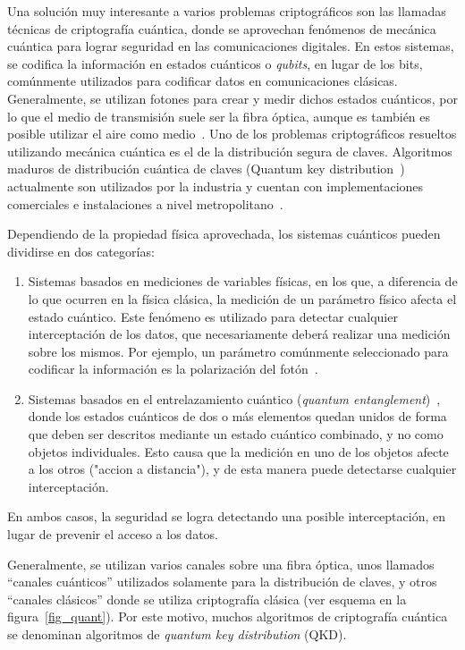 \label{quantcry}
Una solución muy interesante a varios problemas criptográficos son las llamadas técnicas de criptografía cuántica, donde se aprovechan fenómenos de mecánica cuántica para lograr seguridad en las comunicaciones digitales.
En estos sistemas, se codifica la información en estados cuánticos o \textit{qubits}, en lugar de los bits, comúnmente utilizados para codificar datos en comunicaciones clásicas. Generalmente, se utilizan fotones para crear y medir dichos estados cuánticos, por lo que el medio de transmisión suele ser la fibra óptica, aunque es también es posible utilizar el aire como medio~\cite{alleaume2004experimental}.
Uno de los problemas criptográficos resueltos utilizando mecánica cuántica es el de la distribución segura de claves. Algoritmos maduros de distribución cuántica de claves (Quantum key distribution~\cite{bb84}) actualmente son utilizados por la industria y cuentan con implementaciones comerciales e instalaciones a nivel metropolitano~\cite{sasaki2011field}. 

Dependiendo de la propiedad física aprovechada, los sistemas cuánticos pueden dividirse en dos categorías:
\begin{enumerate}
 \item Sistemas basados en mediciones de variables físicas, en los que, a diferencia de lo que ocurren en la física clásica, la medición de un parámetro físico afecta el estado cuántico. Este fenómeno es utilizado para detectar cualquier interceptación de los datos, que necesariamente deberá realizar una medición sobre los mismos. Por ejemplo, un parámetro comúnmente seleccionado para codificar la información es la polarización del fotón~\cite{muller1993experimental}.
 \item Sistemas basados en el entrelazamiento cuántico (\textit{quantum entanglement})~\cite{jennewein2000quantum}, donde los estados cuánticos de dos o más elementos quedan unidos de forma que deben ser descritos mediante un estado cuántico combinado, y no como objetos individuales. Esto causa que la medición en uno de los objetos afecte a los otros ("accion a distancia"), y de esta manera puede detectarse cualquier interceptación.
\end{enumerate}

En ambos casos, la seguridad se logra detectando una posible interceptación, en lugar de prevenir el acceso a los datos.

Generalmente, se utilizan varios canales sobre una fibra óptica, unos llamados ``canales cuánticos'' utilizados solamente para la distribución de claves, y otros ``canales clásicos'' donde se utiliza criptografía clásica (ver esquema en la figura~\ref{fig_quant}). Por este motivo, muchos algoritmos de criptografía cuántica se denominan algoritmos de \textit{quantum key distribution} (QKD).

